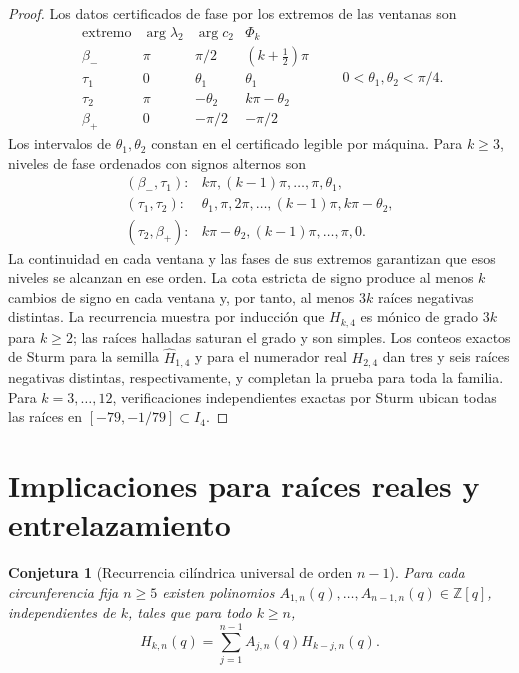 \documentclass[11pt,a4paper]{article}
\newtheorem{conjecture}[theorem]{Conjetura}
\theoremstyle{definition}
\begin{document}
\begin{proof}
Los datos certificados de fase por los extremos de las ventanas son
\[
\begin{array}{c|c|c|c}
\text{extremo}&\arg\lambda_2&\arg c_2&\Phi_k\\ \hline
\beta_-&\pi&\pi/2&(k+\tfrac12)\pi\\
\tau_1&0&\theta_1&\theta_1\\
\tau_2&\pi&-\theta_2&k\pi-\theta_2\\
\beta_+&0&-\pi/2&-\pi/2
\end{array}
\qquad 0<\theta_1,\theta_2<\pi/4.
\]
Los intervalos de $\theta_1,\theta_2$ constan en el certificado
legible por máquina. Para $k\ge3$, niveles de fase ordenados con signos
alternos son
\[
\begin{array}{ll}
(\beta_-,\tau_1):&
k\pi,(k-1)\pi,\ldots,\pi,\theta_1,\\
(\tau_1,\tau_2):&
\theta_1,\pi,2\pi,\ldots,(k-1)\pi,k\pi-\theta_2,\\
(\tau_2,\beta_+):&
k\pi-\theta_2,(k-1)\pi,\ldots,\pi,0.
\end{array}
\]
La continuidad en cada ventana y las fases de sus extremos garantizan
que esos niveles se alcanzan en ese orden. La cota estricta de signo
produce al menos $k$ cambios de signo en cada ventana y, por tanto, al
menos $3k$ raíces negativas distintas. La recurrencia muestra por
inducción que $H_{k,4}$ es mónico de grado $3k$ para $k\ge2$; las raíces
halladas saturan el grado y son simples. Los conteos exactos de Sturm
para la semilla $\widehat H_{1,4}$ y para el numerador real $H_{2,4}$
dan tres y seis raíces negativas distintas, respectivamente, y
completan la prueba para toda la familia. Para
$k=3,\ldots,12$, verificaciones independientes exactas por Sturm ubican
todas las raíces en $[-79,-1/79]\subset I_4$.
\end{proof}

\section{Implicaciones para raíces reales y entrelazamiento}

\begin{conjecture}[Recurrencia cilíndrica universal de orden $n-1$]
\label{conj:recurrencia}
Para cada circunferencia fija $n\ge5$ existen polinomios
$A_{1,n}(q),\ldots,A_{n-1,n}(q)\in\mathbb Z[q]$, independientes de $k$,
tales que para todo $k\ge n$,
\[
H_{k,n}(q)=\sum_{j=1}^{n-1}A_{j,n}(q)H_{k-j,n}(q).
\]
\end{conjecture}
\end{document}
